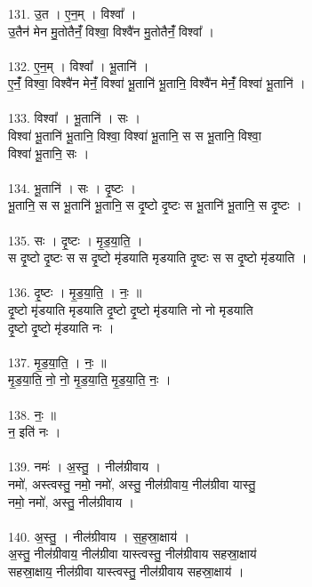 \subsubsection{}
131. उ॒त । ए॒न॒म् । विश्वा᳚ ।\\
उ॒तैन॑ मेन मु॒तोतैनंँ॒ विश्वा॒ विश्वै॑न मु॒तोतैनंँ॒ विश्वा᳚ ।\\
\\
132. ए॒न॒म् । विश्वा᳚ । भू॒तानि॑ ।\\
ए॒नंँ॒ विश्वा॒ विश्वै॑न मेनंँ॒ विश्वा॑ भू॒तानि॑ भू॒तानि॒ विश्वै॑न मेनंँ॒ विश्वा॑ भू॒तानि॑ ।\\
\\
133. विश्वा᳚ । भू॒तानि॑ । सः ।\\
विश्वा॑ भू॒तानि॑ भू॒तानि॒ विश्वा॒ विश्वा॑ भू॒तानि॒ स स भू॒तानि॒ विश्वा॒\\
विश्वा॑ भू॒तानि॒ सः ।\\
\\
134. भू॒तानि॑ । सः । दृ॒ष्टः ।\\
भू॒तानि॒ स स भू॒तानि॑ भू॒तानि॒ स दृ॒ष्टो दृ॒ष्टः स भू॒तानि॑ भू॒तानि॒ स दृ॒ष्टः ।\\
\\
135. सः । दृ॒ष्टः । मृ॒ड॒या॒ति॒ ।\\
स दृ॒ष्टो दृ॒ष्टः स स दृ॒ष्टो मृ॑डयाति मृडयाति दृ॒ष्टः स स दृ॒ष्टो मृ॑डयाति ।\\
\\
136. दृ॒ष्टः । मृ॒ड॒या॒ति॒ । नः॒ ॥\\
दृ॒ष्टो मृ॑डयाति मृडयाति दृ॒ष्टो दृ॒ष्टो मृ॑डयाति नो नो मृडयाति\\
दृ॒ष्टो दृ॒ष्टो मृ॑डयाति नः ।\\
\\
137. मृ॒ड॒या॒ति॒ । नः॒ ॥\\
मृ॒ड॒या॒ति॒ नो॒ नो॒ मृ॒ड॒या॒ति॒ मृ॒ड॒या॒ति॒ नः॒ ।\\
\\
138. नः॒ ॥\\
न॒ इति॑ नः ।\\
\\
139. नमः॑ । अ॒स्तु॒ । नील॑ग्रीवाय ।\\
नमो॑, अस्त्वस्तु॒ नमो॒ नमो॑, अस्तु॒ नील॑ग्रीवाय॒ नील॑ग्रीवा यास्तु॒\\
नमो॒ नमो॑, अस्तु॒ नील॑ग्रीवाय ।\\
\\
140. अ॒स्तु॒ । नील॑ग्रीवाय । स॒ह॒स्रा॒क्षाय॑ ।\\
अ॒स्तु॒ नील॑ग्रीवाय॒ नील॑ग्रीवा यास्त्वस्तु॒ नील॑ग्रीवाय सहस्रा॒क्षाय॑\\
सहस्रा॒क्षाय॒ नील॑ग्रीवा यास्त्वस्तु॒ नील॑ग्रीवाय सहस्रा॒क्षाय॑ ।\\
